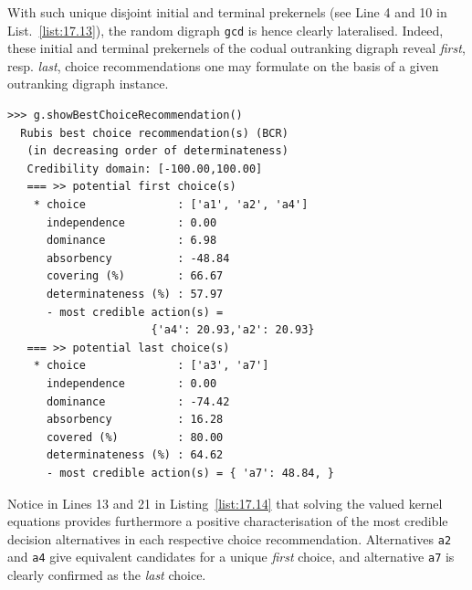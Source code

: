 With such unique disjoint initial and terminal prekernels (see Line 4 and 10 in List.~\vref{list:17.13}), the random digraph \texttt{gcd} is hence clearly lateralised. Indeed, these initial and terminal prekernels of the codual outranking digraph reveal \emph{first}, resp. \emph{last}, choice recommendations one may formulate on the basis of a given outranking digraph instance.
\begin{lstlisting}[caption={Computing a first and last choice recommendation from digraph \texttt{gcd}},label=list:17.14]
>>> g.showBestChoiceRecommendation()
  Rubis best choice recommendation(s) (BCR)
   (in decreasing order of determinateness)   
   Credibility domain: [-100.00,100.00]
   === >> potential first choice(s)
    * choice              : ['a1', 'a2', 'a4']
      independence        : 0.00
      dominance           : 6.98
      absorbency          : -48.84
      covering (%)        : 66.67
      determinateness (%) : 57.97
      - most credible action(s) =
                      {'a4': 20.93,'a2': 20.93}
   === >> potential last choice(s) 
    * choice              : ['a3', 'a7']
      independence        : 0.00
      dominance           : -74.42
      absorbency          : 16.28
      covered (%)         : 80.00
      determinateness (%) : 64.62
      - most credible action(s) = { 'a7': 48.84, }
\end{lstlisting}

Notice in Lines 13 and 21 in Listing~\vref{list:17.14} that solving the valued \Berge kernel equations provides furthermore a positive characterisation of the most credible decision alternatives in each respective choice recommendation. Alternatives \texttt{a2} and \texttt{a4} give equivalent candidates for a unique \emph{first} choice, and alternative \texttt{a7} is clearly confirmed as the \emph{last} choice.

